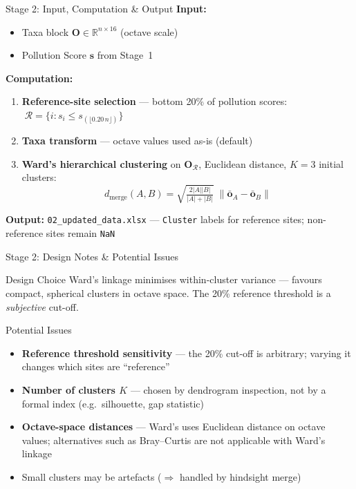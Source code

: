 \documentclass[aspectratio=169, 11pt]{beamer}
\newcommand{\code}[1]{\texttt{\small #1}}
\newcommand{\mat}[1]{\mathbf{#1}}
\newcommand{\R}{\mathbb{R}}
\begin{document}
\begin{frame}{Stage 2: Input, Computation \& Output}
  \textbf{Input:}
  \begin{itemize}\small
    \item Taxa block $\mat{O}\in\R^{n\times 16}$ (octave scale)
    \item Pollution Score $\mathbf{s}$ from Stage~1
  \end{itemize}

  \vspace{0.3em}
  \textbf{Computation:}
  \begin{enumerate}\small
    \item \textbf{Reference-site selection} --- bottom 20\% of pollution scores:
          $\;\mathcal{R} = \bigl\{ i : s_i \le s_{(\lfloor 0.20\,n \rfloor)} \bigr\}$
    \item \textbf{Taxa transform} --- octave values used as-is (default)
    \item \textbf{Ward's hierarchical clustering} on $\mat{O}_{\mathcal{R}}$,
          Euclidean distance, $K{=}3$ initial clusters:
          \[
            d_{\mathrm{merge}}(A,B) =
            \sqrt{\tfrac{2|A||B|}{|A|+|B|}}\;\|\bar{\mathbf{o}}_A - \bar{\mathbf{o}}_B\|
          \]
  \end{enumerate}

  \vspace{0.3em}
  \textbf{Output:} \code{02\_updated\_data.xlsx} --- \code{Cluster} labels for reference sites;
  non-reference sites remain \code{NaN}
\end{frame}

\begin{frame}{Stage 2: Design Notes \& Potential Issues}
  \begin{block}{Design Choice}
    Ward's linkage minimises within-cluster variance ---
    favours compact, spherical clusters in octave space.
    The 20\% reference threshold is a \emph{subjective} cut-off.
  \end{block}

  \vspace{0.4em}
  \begin{alertblock}{Potential Issues}
    \begin{itemize}\small
      \item \textbf{Reference threshold sensitivity} --- the 20\% cut-off
            is arbitrary; varying it changes which sites are ``reference''
      \item \textbf{Number of clusters $K$} --- chosen by dendrogram
            inspection, not by a formal index (e.g.\ silhouette, gap statistic)
      \item \textbf{Octave-space distances} --- Ward's uses Euclidean distance
            on octave values; alternatives such as Bray--Curtis are not applicable
            with Ward's linkage
      \item Small clusters may be artefacts ($\Rightarrow$ handled by hindsight merge)
    \end{itemize}
  \end{alertblock}
\end{frame}
\end{document}
